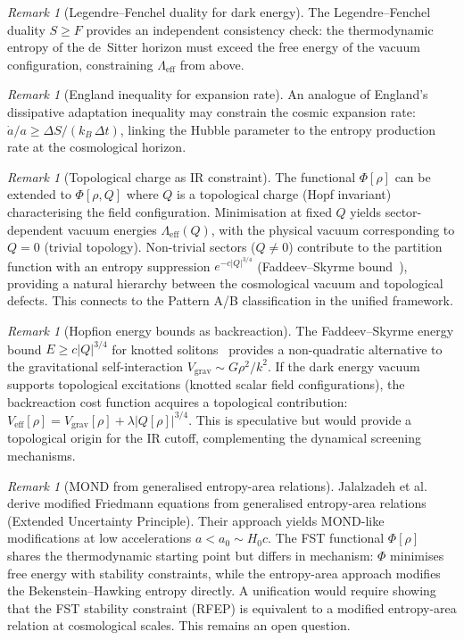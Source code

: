 \documentclass[12pt,a4paper]{article}
\theoremstyle{definition}
\theoremstyle{plain}
\theoremstyle{remark}
\newtheorem{remark}[definition]{Remark}
\begin{document}
\begin{remark}[Legendre--Fenchel duality for dark energy]
The Legendre--Fenchel duality $S \geq F$ provides an independent consistency check: the thermodynamic entropy of the de~Sitter horizon must exceed the free energy of the vacuum configuration, constraining $\Lambda_{\mathrm{eff}}$ from above.
\end{remark}

\begin{remark}[England inequality for expansion rate]
An analogue of England's dissipative adaptation inequality may constrain the cosmic expansion rate: $\dot{a}/a \geq \Delta S / (k_B \, \Delta t)$, linking the Hubble parameter to the entropy production rate at the cosmological horizon.
\end{remark}

\begin{remark}[Topological charge as IR constraint]
\label{rem:topological-charge}
The functional $\Phi[\rho]$ can be extended to $\Phi[\rho, Q]$ where $Q$ is a topological charge (Hopf invariant) characterising the field configuration. Minimisation at fixed $Q$ yields sector-dependent vacuum energies $\Lambda_{\mathrm{eff}}(Q)$, with the physical vacuum corresponding to $Q = 0$ (trivial topology). Non-trivial sectors ($Q \neq 0$) contribute to the partition function with an entropy suppression $e^{-c|Q|^{3/4}}$ (Faddeev--Skyrme bound~\cite{LinYang2004}), providing a natural hierarchy between the cosmological vacuum and topological defects. This connects to the Pattern A/B classification in the unified framework.
\end{remark}

\begin{remark}[Hopfion energy bounds as backreaction]
\label{rem:hopfion-backreaction}
The Faddeev--Skyrme energy bound $E \geq c |Q|^{3/4}$ for knotted solitons~\cite{LinYang2004} provides a non-quadratic alternative to the gravitational self-interaction $V_{\mathrm{grav}} \sim G\rho^2/k^2$. If the dark energy vacuum supports topological excitations (knotted scalar field configurations), the backreaction cost function acquires a topological contribution: $V_{\mathrm{eff}}[\rho] = V_{\mathrm{grav}}[\rho] + \lambda |Q[\rho]|^{3/4}$. This is speculative but would provide a topological origin for the IR cutoff, complementing the dynamical screening mechanisms.
\end{remark}

\begin{remark}[MOND from generalised entropy-area relations]
\label{rem:mond-entropy}
Jalalzadeh et al.~\cite{MONDEntropy2025} derive modified Friedmann equations from generalised entropy-area relations (Extended Uncertainty Principle). Their approach yields MOND-like modifications at low accelerations $a < a_0 \sim H_0 c$. The FST functional $\Phi[\rho]$ shares the thermodynamic starting point but differs in mechanism: $\Phi$ minimises free energy with stability constraints, while the entropy-area approach modifies the Bekenstein--Hawking entropy directly. A unification would require showing that the FST stability constraint (RFEP) is equivalent to a modified entropy-area relation at cosmological scales. This remains an open question.
\end{remark}
\end{document}
